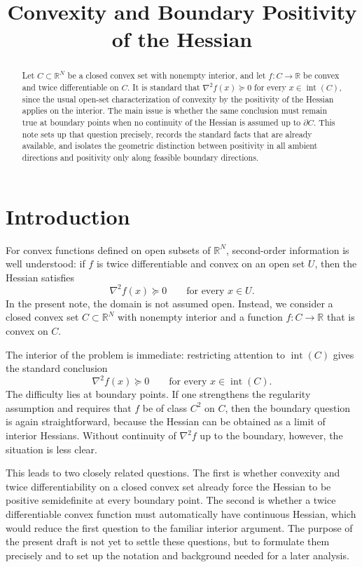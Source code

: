 \documentclass[11pt]{article}
\title{Convexity and Boundary Positivity of the Hessian}
\author{}
\date{}
\theoremstyle{remark}
\newcommand{\R}{\mathbb{R}}
\begin{document}
\maketitle

\begin{abstract}
Let $C \subset \R^N$ be a closed convex set with nonempty interior, and let
$f \colon C \to \R$ be convex and twice differentiable on $C$. It is standard
that $\nabla^2 f(x) \succeq 0$ for every $x \in \operatorname{int}(C)$, since the
usual open-set characterization of convexity by the positivity of the Hessian
applies on the interior. The main issue is whether the same conclusion must
remain true at boundary points when no continuity of the Hessian is assumed up
to $\partial C$. This note sets up that question precisely, records the standard
facts that are already available, and isolates the geometric distinction between
positivity in all ambient directions and positivity only along feasible boundary
directions.
\end{abstract}

\section{Introduction}

For convex functions defined on open subsets of $\R^N$, second-order
information is well understood: if $f$ is twice differentiable and convex on an
open set $U$, then the Hessian satisfies
\[
\nabla^2 f(x) \succeq 0 \qquad \text{for every } x \in U.
\]
In the present note, the domain is not assumed open. Instead, we consider a
closed convex set $C \subset \R^N$ with nonempty interior and a function
$f \colon C \to \R$ that is convex on $C$.

The interior of the problem is immediate: restricting attention to
$\operatorname{int}(C)$ gives the standard conclusion
\[
\nabla^2 f(x) \succeq 0 \qquad \text{for every } x \in \operatorname{int}(C).
\]
The difficulty lies at boundary points. If one strengthens the regularity
assumption and requires that $f$ be of class $C^2$ on $C$, then the boundary
question is again straightforward, because the Hessian can be obtained as a
limit of interior Hessians. Without continuity of $\nabla^2 f$ up to the
boundary, however, the situation is less clear.

This leads to two closely related questions. The first is whether convexity and
twice differentiability on a closed convex set already force the Hessian to be
positive semidefinite at every boundary point. The second is whether a twice
differentiable convex function must automatically have continuous Hessian, which
would reduce the first question to the familiar interior argument. The purpose
of the present draft is not yet to settle these questions, but to formulate them
precisely and to set up the notation and background needed for a later analysis.
\end{document}
